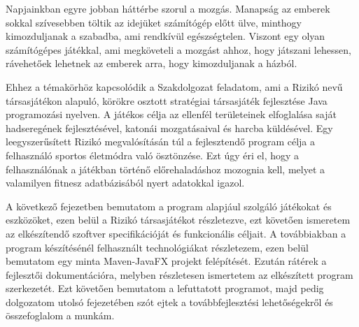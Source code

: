 Napjainkban egyre jobban háttérbe szorul a mozgás.
Manapság az emberek sokkal szívesebben töltik az idejüket számítógép előtt ülve, minthogy kimozduljanak a szabadba, ami rendkívül egészségtelen.
Viszont egy olyan számítógépes játékkal, ami megköveteli a mozgást ahhoz, hogy játszani lehessen, rávehetőek lehetnek az emberek arra, hogy kimozduljanak a házból. 

Ehhez a témakörhöz kapcsolódik a Szakdolgozat feladatom, ami a Rizikó nevű társasjátékon alapuló, körökre osztott stratégiai társasjáték fejlesztése Java programozási nyelven.
A játékos célja az ellenfél területeinek elfoglalása saját hadseregének fejlesztésével, katonái mozgatásaival és harcba küldésével.
Egy leegyszerűsített Rizikó megvalósításán túl a fejlesztendő program célja a felhasználó sportos életmódra való ösztönzése.
Ezt úgy éri el, hogy a felhasználónak a játékban történő előrehaladáshoz mozognia kell, melyet a valamilyen fitnesz adatbázisából nyert adatokkal igazol. 

A következő fejezetben bemutatom a program alapjául szolgáló játékokat és eszközöket, ezen belül a Rizikó társasjátékot részletezve, ezt követően ismeretem az elkészítendő szoftver specifikációját és funkcionális céljait.
A továbbiakban a program készítésénél felhasznált technológiákat részletezem, ezen belül bemutatom egy minta Maven-JavaFX projekt felépítését.
Ezután rátérek a fejlesztői dokumentációra, melyben részletesen ismertetem az elkészített program szerkezetét.
Ezt követően bemutatom a lefuttatott programot, majd pedig dolgozatom utolsó fejezetében szót ejtek a továbbfejlesztési lehetőségekről és összefoglalom a munkám. 